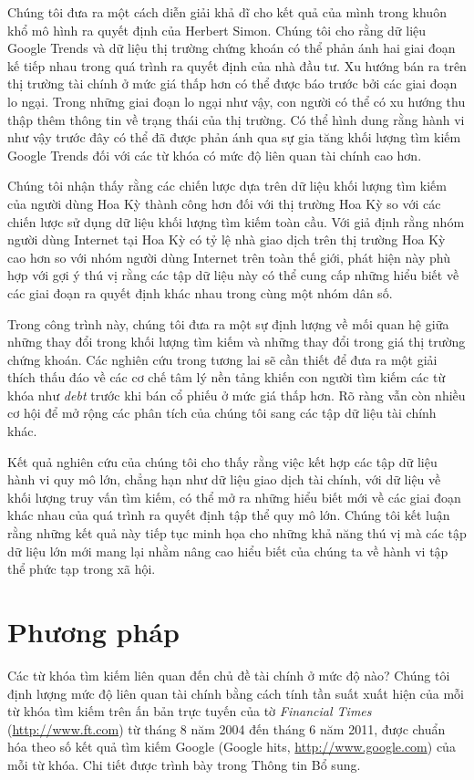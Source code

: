 Chúng tôi đưa ra một cách diễn giải khả dĩ cho kết quả của mình trong khuôn khổ mô hình ra quyết định của Herbert Simon. Chúng tôi cho rằng dữ liệu Google Trends và dữ liệu thị trường chứng khoán có thể phản ánh hai giai đoạn kế tiếp nhau trong quá trình ra quyết định của nhà đầu tư. Xu hướng bán ra trên thị trường tài chính ở mức giá thấp hơn có thể được báo trước bởi các giai đoạn lo ngại. Trong những giai đoạn lo ngại như vậy, con người có thể có xu hướng thu thập thêm thông tin về trạng thái của thị trường. Có thể hình dung rằng hành vi như vậy trước đây có thể đã được phản ánh qua sự gia tăng khối lượng tìm kiếm Google Trends đối với các từ khóa có mức độ liên quan tài chính cao hơn.

Chúng tôi nhận thấy rằng các chiến lược dựa trên dữ liệu khối lượng tìm kiếm của người dùng Hoa Kỳ thành công hơn đối với thị trường Hoa Kỳ so với các chiến lược sử dụng dữ liệu khối lượng tìm kiếm toàn cầu. Với giả định rằng nhóm người dùng Internet tại Hoa Kỳ có tỷ lệ nhà giao dịch trên thị trường Hoa Kỳ cao hơn so với nhóm người dùng Internet trên toàn thế giới, phát hiện này phù hợp với gợi ý thú vị rằng các tập dữ liệu này có thể cung cấp những hiểu biết về các giai đoạn ra quyết định khác nhau trong cùng một nhóm dân số.

Trong công trình này, chúng tôi đưa ra một sự định lượng về mối quan hệ giữa những thay đổi trong khối lượng tìm kiếm và những thay đổi trong giá thị trường chứng khoán. Các nghiên cứu trong tương lai sẽ cần thiết để đưa ra một giải thích thấu đáo về các cơ chế tâm lý nền tảng khiến con người tìm kiếm các từ khóa như \emph{debt} trước khi bán cổ phiếu ở mức giá thấp hơn. Rõ ràng vẫn còn nhiều cơ hội để mở rộng các phân tích của chúng tôi sang các tập dữ liệu tài chính khác.

Kết quả nghiên cứu của chúng tôi cho thấy rằng việc kết hợp các tập dữ liệu hành vi quy mô lớn, chẳng hạn như dữ liệu giao dịch tài chính, với dữ liệu về khối lượng truy vấn tìm kiếm, có thể mở ra những hiểu biết mới về các giai đoạn khác nhau của quá trình ra quyết định tập thể quy mô lớn. Chúng tôi kết luận rằng những kết quả này tiếp tục minh họa cho những khả năng thú vị mà các tập dữ liệu lớn mới mang lại nhằm nâng cao hiểu biết của chúng ta về hành vi tập thể phức tạp trong xã hội.

\section{Phương pháp}

Các từ khóa tìm kiếm liên quan đến chủ đề tài chính ở mức độ nào? Chúng tôi định lượng mức độ liên quan tài chính bằng cách tính tần suất xuất hiện của mỗi từ khóa tìm kiếm trên ấn bản trực tuyến của tờ \emph{Financial Times} (\url{http://www.ft.com}) từ tháng 8 năm 2004 đến tháng 6 năm 2011, được chuẩn hóa theo số kết quả tìm kiếm Google (Google hits, \url{http://www.google.com}) của mỗi từ khóa. Chi tiết được trình bày trong Thông tin Bổ sung.


